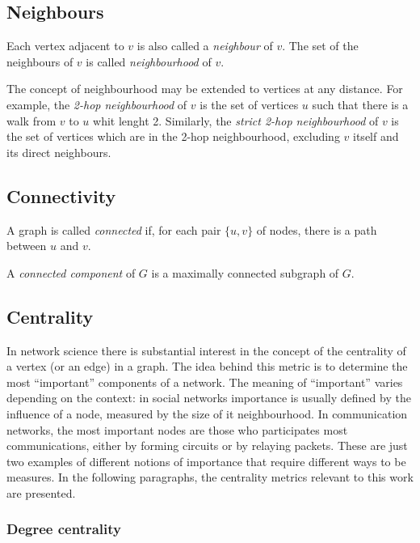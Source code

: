 \documentclass[oneside,openany]{memoir}
\begin{document}
\subsection{Neighbours}\label{neighbours}

Each vertex adjacent to $v$ is also called a \emph{neighbour} of $v$.
The set of the neighbours of $v$ is called \emph{neighbourhood} of $v$.

The concept of neighbourhood may be extended to vertices at any
distance. For example, the \emph{2-hop neighbourhood} of $v$ is the set
of vertices $u$ such that there is a walk from $v$ to $u$ whit lenght 2.
Similarly, the \emph{strict 2-hop neighbourhood} of $v$ is the set of
vertices which are in the 2-hop neighbourhood, excluding $v$ itself and
its direct neighbours.

\subsection{Connectivity}\label{connectivity}

A graph is called \emph{connected} if, for each pair $\{u,v\}$ of nodes,
there is a path between $u$ and $v$.

A \emph{connected component} of $G$ is a maximally connected subgraph of
$G$.

\subsection{Centrality}\label{centrality}

In network science there is substantial interest in the concept of the
centrality of a vertex (or an edge) in a graph. The idea behind this
metric is to determine the most ``important'' components of a network.
The meaning of ``important'' varies depending on the context: in social
networks importance is usually defined by the influence of a node,
measured by the size of it neighbourhood. In communication networks, the
most important nodes are those who participates most communications,
either by forming circuits or by relaying packets. These are just two
examples of different notions of importance that require different ways
to be measures. In the following paragraphs, the centrality metrics
relevant to this work are presented.

\subsubsection{Degree centrality}\label{degree-centrality}
\end{document}
